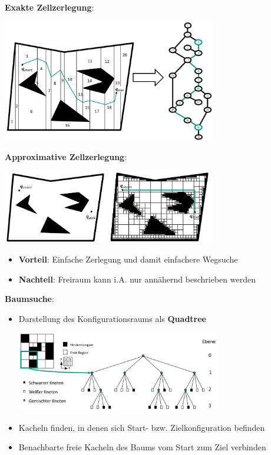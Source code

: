 \textbf{Exakte Zellzerlegung}:
\begin{center}
	\includegraphics[width=0.7\textwidth]{images/e-zz.png}
\end{center}
\pagebreak

\textbf{Approximative Zellzerlegung}:
\begin{center}
	\includegraphics[width=0.7\textwidth]{images/a-zz.png}
\end{center}
\begin{itemize}
	\item \textbf{Vorteil}: Einfache Zerlegung und damit einfachere Wegsuche
	\item \textbf{Nachteil}: Freiraum kann i.A. nur annähernd beschrieben werden
\end{itemize}
\bigskip
\textbf{Baumsuche}:
\begin{itemize}
	\item Darstellung des Konfigurationsraums als \textbf{Quadtree}
	\begin{center}
		\includegraphics[width=0.7\textwidth]{images/quadtree.png}
	\end{center}
	\item Kacheln finden, in denen sich Start- bzw. Zielkonfiguration befinden
	\item Benachbarte freie Kacheln des Baums vom Start zum Ziel verbinden
\end{itemize}
